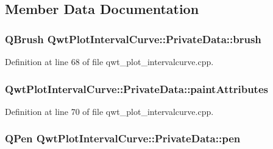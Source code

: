 \subsection{Member Data Documentation}
\hypertarget{class_qwt_plot_interval_curve_1_1_private_data_a50768f4a17b1c87a464b9fc3d9303732}{
\subsubsection[{brush}]{\setlength{\rightskip}{0pt plus 5cm}Q\-Brush Qwt\-Plot\-Interval\-Curve\-::\-Private\-Data\-::brush}}\label{class_qwt_plot_interval_curve_1_1_private_data_a50768f4a17b1c87a464b9fc3d9303732}


Definition at line 68 of file qwt\-\_\-plot\-\_\-intervalcurve.\-cpp.

\hypertarget{class_qwt_plot_interval_curve_1_1_private_data_a6fecb4641a25c346c24c032ae1c9e6fb}{
\subsubsection[{paint\-Attributes}]{ Qwt\-Plot\-Interval\-Curve\-::\-Private\-Data\-::paint\-Attributes}}\label{class_qwt_plot_interval_curve_1_1_private_data_a6fecb4641a25c346c24c032ae1c9e6fb}


Definition at line 70 of file qwt\-\_\-plot\-\_\-intervalcurve.\-cpp.

\hypertarget{class_qwt_plot_interval_curve_1_1_private_data_ae397038c2385d080eecd192118e4fc3c}{
\subsubsection[{pen}]{\setlength{\rightskip}{0pt plus 5cm}Q\-Pen Qwt\-Plot\-Interval\-Curve\-::\-Private\-Data\-::pen}}\label{class_qwt_plot_interval_curve_1_1_private_data_ae397038c2385d080eecd192118e4fc3c}


